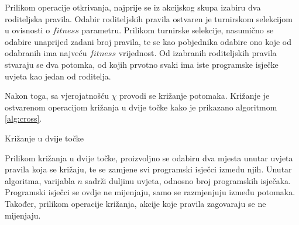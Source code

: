 \documentclass[times, utf8, zavrsni]{fer}
\begin{document}
Prilikom operacije otkrivanja, najprije se iz akcijskog skupa izabiru dva roditeljska pravila.
Odabir roditeljskih pravila ostvaren je turnirskom selekcijom  u ovisnosti o $fitness$ parametru.
Prilikom turnirske selekcije, nasumično se odabire unaprijed zadani broj pravila, te se kao pobjednika odabire ono koje od odabranih ima najveću $fitness$ vrijednost.
Od izabranih roditeljskih pravila stvaraju se dva potomka, od kojih prvotno svaki ima iste programske isječke uvjeta kao jedan od roditelja.

Nakon toga, sa vjerojatnošću $\chi$ provodi se križanje  potomaka.
Križanje je ostvarenom operacijom križanja u dvije točke  kako je prikazano algoritmom \ref{alg:cross}.
\begin{algorithm}[h]
    \caption{Križanje u dvije točke}
    \label{alg:cross}
    \begin{algorithmic}
        \STATE{$x :=$ proizvoljan decimalni broj iz intervala [0, n)}
        \STATE{$y :=$ proizvoljan decimalni broj iz intervala [0, n)}
        \ENDIF
        \ENDFOR
    \end{algorithmic}
\end{algorithm}
Prilikom križanja u dvije točke, proizvoljno se odabiru dva mjesta unutar uvjeta pravila koja se križaju, te se zamjene svi programski isječci između njih.
Unutar algoritma, varijabla $n$ sadrži duljinu uvjeta, odnosno broj programskih isječaka.
Programski isječci se ovdje ne mijenjaju, samo se razmjenjuju između potomaka.
Također, prilikom operacije križanja, akcije koje pravila zagovaraju se ne mijenjaju.
\end{document}
